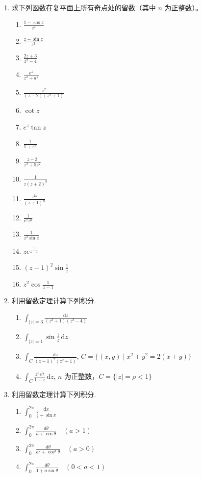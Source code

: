 \documentclass[openany,oneside]{ctexbook}
\begin{document}
\begin{enumerate}[label=\arabic*., start=1]
\item 求下列函数在复平面上所有奇点处的留数（其中 \(n\) 为正整数）。
\begin{enumerate}[label=(\arabic*)]
\item \(\displaystyle \frac{1 - \cos z}{z^2}\)
\item \(\displaystyle \frac{z - \sin z}{z^3}\)
\item \(\displaystyle \frac{2z + 3}{z^2 - 4}\)
\item \(\displaystyle \frac{e^z}{z^2 + a^2}\)
\item \(\displaystyle \frac{z^2}{(z - 2)(z^2 + 1)}\)
\item \(\displaystyle \cot z\)
\item \(\displaystyle e^z \tan z\)
\item \(\displaystyle \frac{1}{1 + z^n}\)
\item \(\displaystyle \frac{z - 3}{z^3 + 5z^2}\)
\item \(\displaystyle \frac{1}{z(z + 2)^3}\)
\item \(\displaystyle \frac{z^{2n}}{(z + 1)^n}\)
\item \(\displaystyle \frac{1}{e^z z^n}\)
\item \(\displaystyle \frac{1}{z^2 \sin z}\)
\item \(\displaystyle z e^{\frac{1}{z - 1}}\)
\item \(\displaystyle (z - 1)^2 \sin \frac{1}{z}\)
\item \(\displaystyle z^2 \cos \frac{1}{z - 1}\)
\end{enumerate}

\item 利用留数定理计算下列积分.
\begin{enumerate}[label=(\arabic*)]
\item \(\displaystyle \int_{|z|=3} \frac{\mathrm{d}z}{(z^2+1)(z^2-4)}\)
\item \(\displaystyle \int_{|z|=1} \sin \frac{1}{z} \, \mathrm{d}z\)
\item \(\displaystyle \int_C \frac{\mathrm{d}z}{(z-1)^2(z^2+1)}\), \(C = \{ (x,y) \mid x^2+y^2=2(x+y) \}\)
\item \(\displaystyle \int_C \frac{z^n e^{\frac{1}{z}}}{1+z} \, \mathrm{d}z\), \(n\) 为正整数，\(C = \{ |z|=\rho < 1 \}\)
\end{enumerate}

\item 利用留数定理计算下列积分.
\begin{enumerate}[label=(\arabic*)]
\item \(\displaystyle \int_0^{2\pi} \frac{\mathrm{d}x}{\frac{5}{4}+\sin x}\)
\item \(\displaystyle \int_0^{2\pi} \frac{d\theta}{a+\cos \theta} \quad (a>1)\)
\item \(\displaystyle \int_0^{2\pi} \frac{d\theta}{a^2+\cos^2 \theta} \quad (a>0)\)
\item \(\displaystyle \int_0^{2\pi} \frac{d\theta}{1+a\sin \theta} \quad (0<a<1)\)
\end{enumerate}


\end{enumerate}
\end{document}
